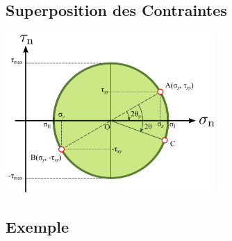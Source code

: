 \documentclass[a4paper]{article}
\begin{document}
\subsection{Superposition des Contraintes}





\begin{center}
\includegraphics[width=0.6\textwidth]{images/SuperpositionMohr.PNG}
\end{center}





\subsection{Exemple}
\end{document}
